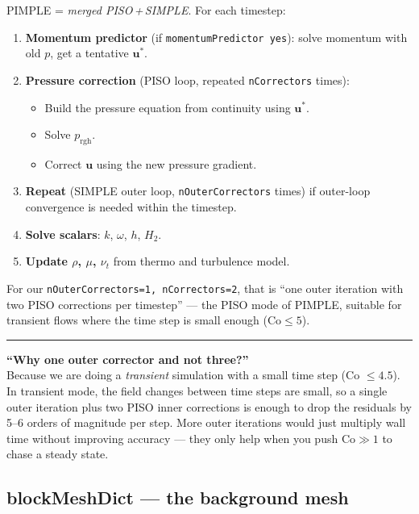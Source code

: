 \documentclass[11pt,a4paper]{article}
\newenvironment{vivabox}[1][]{%
    \par\medskip\noindent
    \begin{list}{}{%
        \setlength{\leftmargin}{1.4em}%
        \setlength{\rightmargin}{0pt}%
        \setlength{\topsep}{0pt}%
    }\item[]%
    \textcolor{orange!60!black}{\rule[-0.4em]{2.5pt}{1.0em}}%
    \hspace{0.6em}{\sffamily\bfseries\color{orange!50!black}#1}\par\smallskip
}{%
    \end{list}\medskip
}
\begin{document}
PIMPLE = \emph{merged PISO\,+\,SIMPLE}. For each timestep:

\begin{enumerate}[leftmargin=1.5em,topsep=2pt]
    \item \textbf{Momentum predictor} (if \texttt{momentumPredictor
    yes}): solve momentum with old $p$, get a tentative $\mathbf{u}^*$.
    \item \textbf{Pressure correction} (PISO loop, repeated
    \texttt{nCorrectors} times):
    \begin{itemize}[leftmargin=1em,topsep=1pt]
        \item Build the pressure equation from continuity using
        $\mathbf{u}^*$.
        \item Solve $p_{\mathrm{rgh}}$.
        \item Correct $\mathbf{u}$ using the new pressure gradient.
    \end{itemize}
    \item \textbf{Repeat} (SIMPLE outer loop, \texttt{nOuterCorrectors}
    times) if outer-loop convergence is needed within the timestep.
    \item \textbf{Solve scalars}: $k$, $\omega$, $h$, $H_2$.
    \item \textbf{Update $\rho$, $\mu$, $\nu_t$} from thermo and
    turbulence model.
\end{enumerate}

For our \texttt{nOuterCorrectors=1, nCorrectors=2}, that is
``one outer iteration with two PISO corrections per timestep'' --- the
PISO mode of PIMPLE, suitable for transient flows where the time step
is small enough (\(\mathrm{Co}\le 5\)).

\begin{vivabox}[Likely viva question]
\textbf{``Why one outer corrector and not three?''}\\
Because we are doing a \emph{transient} simulation with a
small time step (Co $\le 4.5$). In transient mode, the field changes
between time steps are small, so a single outer iteration plus two
PISO inner corrections is enough to drop the residuals by 5--6 orders
of magnitude per step. More outer iterations would just multiply wall
time without improving accuracy --- they only help when you push
$\mathrm{Co}\gg 1$ to chase a steady state.
\end{vivabox}

\subsection{blockMeshDict --- the background mesh}
\end{document}
